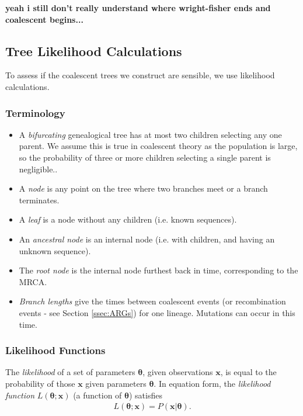 \documentclass[12pt]{article}
\begin{document}
\textbf{yeah i still don't really understand where wright-fisher ends and coalescent begins...}

\subsection{Tree Likelihood Calculations}\label{ssec:treelike}

To assess if the coalescent trees we construct are sensible, we use likelihood calculations.

\subsubsection{Terminology}
\begin{itemize}
\item A \emph{bifurcating} genealogical tree has at most two children selecting any one parent. We assume this is true in coalescent theory as the population is large, so the probability of three or more children selecting a single parent is negligible..
\item A \emph{node} is any point on the tree where two branches meet or a branch terminates.
\item A \emph{leaf} is a node without any children (i.e. known sequences).
\item An \emph{ancestral node} is an internal node (i.e. with children, and having an unknown sequence).
\item The \emph{root node} is the internal node furthest back in time, corresponding to the MRCA.
  \item \emph{Branch lengths} give the times between coalescent events (or recombination events - see Section \ref{ssec:ARGs}) for one lineage. Mutations can occur in this time.
\end{itemize}

\subsubsection{Likelihood Functions}\label{sssec:likelihoods}
The \emph{likelihood} of a set of parameters $\bm{\theta}$, given observations $\bm{x}$, is equal to the probability of those $\bm{x}$ given parameters $\bm{\theta}$. In equation form, the \emph{likelihood function} $L( \bm{\theta};\bm{x})$ (a function of $\bm{\theta}$) satisfies
\begin{eqnarray}
  L( \bm{\theta};\bm{x}) = P( \bm{x}|\bm{\theta}).
\end{eqnarray}
\end{document}
